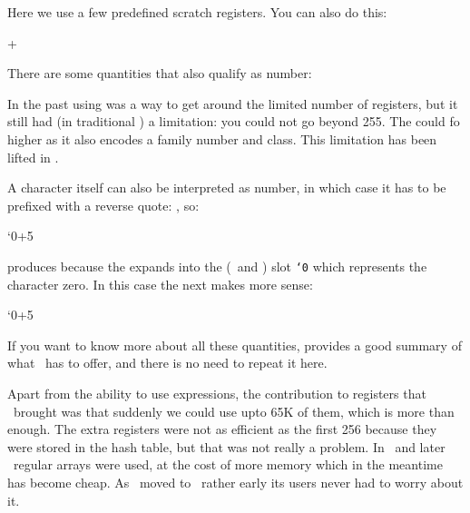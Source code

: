 \starttyping[option=TEX]
\scratchcounter\scratchcounterone
\stoptyping

Here we use a few predefined scratch registers. You can also do this:

\starttyping[option=TEX]
\scratchcounter\numexpr\scratchcounterone+\scratchcountertwo\relax
\stoptyping

There are some quantities that also qualify as number:

\starttyping[option=TEX]
\chardef{} %
\scratchcounter\MyChar
\stoptyping

In the past using \type {\chardef} was a way to get around the limited number of
registers, but it still had (in traditional \TEX) a limitation: you could not go
beyond 255. The \type {\mathchardef} could fo higher as it also encodes a family
number and class. This limitation has been lifted in \LUATEX.

A character itself can also be interpreted as number, in which case it has to be
prefixed with a reverse quote: , so:

\startbuffer
\scratchcounter\numexpr`0+5\relax
\char\scratchcounter
\stopbuffer

\typebuffer[option=TEX]

produces \quotation {\inlinebuffer} because the  expands into the
(\ASCII\ and ) slot {\tt \number`0} which represents the character zero. In
this case the next makes more sense:

\starttyping[option=TEX]
\char\numexpr`0+5\relax
\stoptyping

If you want to know more about all these quantities, 
provides a good summary of what \TEX\ has to offer, and there is no need to repeat
it here.

\stopsection

\startsection[title={\ETEX\ primitives}]

Apart from the ability to use expressions, the contribution to registers that
\ETEX\ brought was that suddenly we could use upto 65K of them, which is more
than enough. The extra registers were not as efficient as the first 256 because
they were stored in the hash table, but that was not really a problem. In \OMEGA\
and later \LUATEX\ regular arrays were used, at the cost of more memory which in
the meantime has become cheap. As \CONTEXT\ moved to \ETEX\ rather early its
users never had to worry about it.

\stopsection

